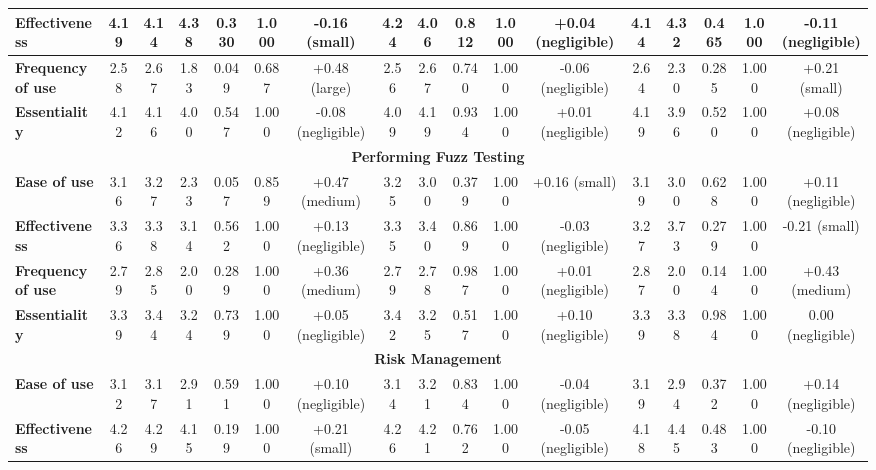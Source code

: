 \begin{tiny}
\begin{longtable}{@{}lcccccccccccccccc@{}}
\textbf{Effectiveness} & 4.19 & 4.14 & 4.38 & 0.330 & 1.000 & \multicolumn{1}{c|}{-0.16 (small)} & 4.24 & 4.06 & 0.812 & 1.000 & \multicolumn{1}{c|}{+0.04 (negligible)} & 4.14 & 4.32 & 0.465 & 1.000 & -0.11 (negligible) \\ \midrule
\textbf{Frequency of use} & 2.58 & 2.67 & 1.83 & 0.049 & 0.687 & \multicolumn{1}{c|}{+0.48 (large)} & 2.56 & 2.67 & 0.740 & 1.000 & \multicolumn{1}{c|}{-0.06 (negligible)} & 2.64 & 2.30 & 0.285 & 1.000 & +0.21 (small) \\ \midrule
\textbf{Essentiality} & 4.12 & 4.16 & 4.00 & 0.547 & 1.000 & \multicolumn{1}{c|}{-0.08 (negligible)} & 4.09 & 4.19 & 0.934 & 1.000 & \multicolumn{1}{c|}{+0.01 (negligible)} & 4.19 & 3.96 & 0.520 & 1.000 & +0.08 (negligible) \\ \midrule
\multicolumn{17}{c}{\textbf{Performing Fuzz Testing}} \\ \midrule
\textbf{Ease of use} & 3.16 & 3.27 & 2.33 & 0.057 & 0.859 & \multicolumn{1}{c|}{+0.47 (medium)} & 3.25 & 3.00 & 0.379 & 1.000 & \multicolumn{1}{c|}{+0.16 (small)} & 3.19 & 3.00 & 0.628 & 1.000 & +0.11 (negligible) \\ \midrule
\textbf{Effectiveness} & 3.36 & 3.38 & 3.14 & 0.562 & 1.000 & \multicolumn{1}{c|}{+0.13 (negligible)} & 3.35 & 3.40 & 0.869 & 1.000 & \multicolumn{1}{c|}{-0.03 (negligible)} & 3.27 & 3.73 & 0.279 & 1.000 & -0.21 (small) \\ \midrule
\textbf{Frequency of use} & 2.79 & 2.85 & 2.00 & 0.289 & 1.000 & \multicolumn{1}{c|}{+0.36 (medium)} & 2.79 & 2.78 & 0.987 & 1.000 & \multicolumn{1}{c|}{+0.01 (negligible)} & 2.87 & 2.00 & 0.144 & 1.000 & +0.43 (medium) \\ \midrule
\textbf{Essentiality} & 3.39 & 3.44 & 3.24 & 0.739 & 1.000 & \multicolumn{1}{c|}{+0.05 (negligible)} & 3.42 & 3.25 & 0.517 & 1.000 & \multicolumn{1}{c|}{+0.10 (negligible)} & 3.39 & 3.38 & 0.984 & 1.000 & 0.00 (negligible) \\ \midrule
\multicolumn{17}{c}{\textbf{Risk Management}} \\ \midrule
\textbf{Ease of use} & 3.12 & 3.17 & 2.91 & 0.591 & 1.000 & \multicolumn{1}{c|}{+0.10 (negligible)} & 3.14 & 3.21 & 0.834 & 1.000 & \multicolumn{1}{c|}{-0.04 (negligible)} & 3.19 & 2.94 & 0.372 & 1.000 & +0.14 (negligible) \\ \midrule
\textbf{Effectiveness} & 4.26 & 4.29 & 4.15 & 0.199 & 1.000 & \multicolumn{1}{c|}{+0.21 (small)} & 4.26 & 4.21 & 0.762 & 1.000 & \multicolumn{1}{c|}{-0.05 (negligible)} & 4.18 & 4.45 & 0.483 & 1.000 & -0.10 (negligible) \\ \midrule

\end{longtable}
\end{tiny}
